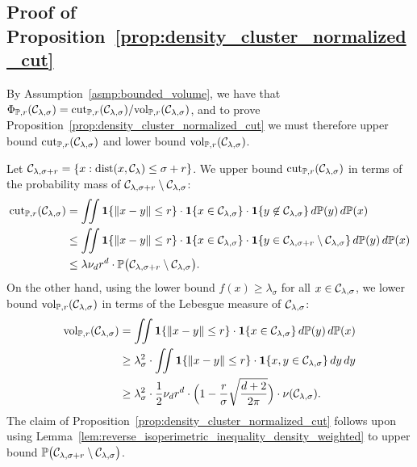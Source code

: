 \subsection{Proof of Proposition~\ref{prop:density_cluster_normalized_cut}}
\label{subsec:density_cluster_ncut}
By Assumption~\ref{asmp:bounded_volume}, we have that $\Phi_{\mathbb{P},r}(\mathcal{C}_{\lambda,\sigma}) = \mathrm{cut}_{\mathbb{P},r}(\mathcal{C}_{\lambda,\sigma})/\mathrm{vol}_{\mathbb{P},r}(\mathcal{C}_{\lambda,\sigma})$, and to prove Proposition~\ref{prop:density_cluster_normalized_cut} we must therefore upper bound $\mathrm{cut}_{\mathbb{P},r}(\mathcal{C}_{\lambda,\sigma})$ and lower bound $\mathrm{vol}_{\mathbb{P},r}(\mathcal{C}_{\lambda,\sigma})$. 

Let $\mathcal{C}_{\lambda,\sigma + r} = \{x: \mathrm{dist}(x,\mathcal{C}_{\lambda}) \leq \sigma + r\}$. We upper bound $\mathrm{cut}_{\mathbb{P},r}(\mathcal{C}_{\lambda,\sigma})$ in terms of the probability mass of $\mathcal{C}_{\lambda,\sigma + r} \setminus \mathcal{C}_{\lambda,\sigma}$:
\begin{align*}
\mathrm{cut}_{\mathbb{P},r}(\mathcal{C}_{\lambda,\sigma}) & = \iint \mathbf{1}\{\|x - y\| \leq r \} \cdot \mathbf{1}\{x \in \mathcal{C}_{\lambda,\sigma}\} \cdot \mathbf{1}\{y \not\in \mathcal{C}_{\lambda,\sigma} \} \,d\mathbb{P}(y) \,d\mathbb{P}(x) \\
& \leq  \iint \mathbf{1}\{\|x - y\| \leq r \} \cdot \mathbf{1}\{x \in \mathcal{C}_{\lambda,\sigma}\} \cdot \mathbf{1}\{y \in \mathcal{C}_{\lambda,\sigma + r} \setminus \mathcal{C}_{\lambda,\sigma}  \} \,d\mathbb{P}(y) \,d\mathbb{P}(x) \\
& \leq \lambda \nu_d r^d \cdot \mathbb{P}\bigl(\mathcal{C}_{\lambda,\sigma + r} \setminus \mathcal{C}_{\lambda,\sigma}\bigr).
\end{align*}
On the other hand, using the lower bound $f(x) \geq \lambda_{\sigma} $ for all $x \in \mathcal{C}_{\lambda,\sigma}$, we lower bound $\mathrm{vol}_{\mathbb{P},r}(\mathcal{C}_{\lambda,\sigma})$ in terms of the Lebesgue measure of $\mathcal{C}_{\lambda,\sigma}$:
\begin{align*}
\mathrm{vol}_{\mathbb{P},r}(\mathcal{C}_{\lambda,\sigma}) & = \iint \mathbf{1}\{\|x - y\| \leq r \} \cdot \mathbf{1}\{x \in \mathcal{C}_{\lambda,\sigma}\} \,d\mathbb{P}(y) \,d\mathbb{P}(x) \\
& \geq \lambda_{\sigma}^2 \cdot \iint \mathbf{1}\{\|x - y\| \leq r \} \cdot \mathbf{1}\{x,y \in \mathcal{C}_{\lambda,\sigma}\} \,dy \,dy \\
& \geq \lambda_{\sigma}^2 \cdot \frac{1}{2} \nu_d r^d \cdot \Bigl(1 - \frac{r}{\sigma} \sqrt{\frac{d + 2}{2\pi}}\Bigr) \cdot \nu(\mathcal{C}_{\lambda,\sigma}).
\end{align*}
The claim of Proposition~\ref{prop:density_cluster_normalized_cut} follows upon using Lemma~\ref{lem:reverse_isoperimetric_inequality_density_weighted} to upper bound $\mathbb{P}\bigl(\mathcal{C}_{\lambda,\sigma + r} \setminus \mathcal{C}_{\lambda,\sigma}\bigr)$.

